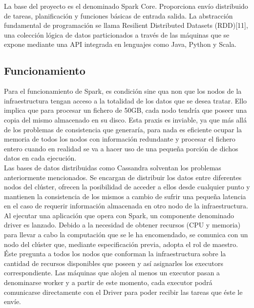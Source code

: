 La base del proyecto es el denominado Spark Core. Proporciona envío distribuido de tareas, planificación y funciones básicas de entrada salida. La abstracción fundamental de programación se llama Resilient Distributed Datasets (RDD)[11], una colección lógica de datos particionados a través de las máquinas que se expone mediante una API integrada en lenguajes como Java, Python y Scala.\\

\subsection{Funcionamiento}

Para el funcionamiento de Spark, es condición sine qua non que los nodos de la infraestructura tengan acceso a la totalidad de los datos que se desea tratar. Ello implica que para procesar un fichero de 50GB, cada nodo tendría que poseer una copia del mismo almacenado en su disco. Esta praxis es inviable, ya que más allá de los problemas de consistencia que generaría, para nada es eficiente ocupar la memoria de todos los nodos con información redundante y procesar el fichero entero cuando en realidad se va a hacer uso de una pequeña porción de dichos datos en cada ejecución.\\

Las bases de datos distribuidas como Cassandra solventan los problemas anteriormente mencionados. Se encargan de distribuir los datos entre diferentes nodos del clúster, ofrecen la posibilidad de acceder a ellos desde cualquier punto y mantienen la consistencia de los mismos a cambio de sufrir una pequeña latencia en el caso de requerir información almacenada en otro nodo de la infraestructura.\\ 

Al ejecutar una aplicación que opera con Spark, un componente denominado driver es lanzado. Debido a la necesidad de obtener recursos (CPU y memoria) para llevar a cabo la computación que se le ha encomendado, se comunica con un nodo del clúster que, mediante especificación previa, adopta el rol de maestro. Éste pregunta a todos los nodos que conforman la infraestructura sobre la cantidad de recursos disponibles que poseen y así asignarles los executors correspondiente. Las máquinas que alojen al menos un executor pasan a denominarse worker y a partir de este momento, cada executor podrá comunicarse directamente con el Driver para poder recibir las tareas que éste le envíe.\\

